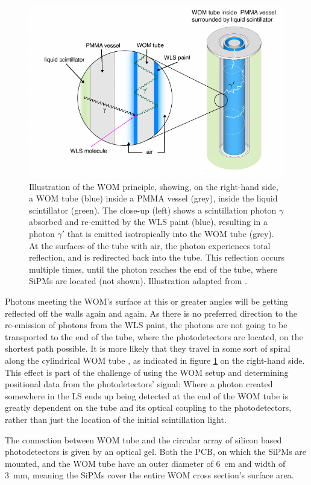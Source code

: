 	\begin{figure}[h]
		\centering
		\includegraphics[width=.8\textwidth]{pictures/wom-principle.pdf}
		\caption{Illustration of the \ac{WOM} principle, showing, on the right-hand side, a \ac{WOM} tube (blue) inside a \ac{PMMA} vessel (grey), inside the liquid scintillator (green). The close-up (left) shows a scintillation photon $\gamma$ absorbed and re-emitted by the \ac{WLS} paint (blue), resulting in a photon $\gamma'$ that is emitted isotropically into the \ac{WOM} tube (grey). At the surfaces of the tube with air, the photon experiences total reflection, and is redirected back into the tube. This reflection occurs multiple times, until the photon reaches the end of the tube, where \acsp{SiPM} are located (not shown). Illustration adapted from \cite{ZIMMERMANN}.}
		\label{fig:wom-principle}
	\end{figure}

	Photons meeting the \ac{WOM}'s surface at this or greater angles will be getting reflected off the walls again and again. As there is no preferred direction to the re-emission of photons from the \ac{WLS} paint, the photons are not going to be transported to the end of the tube, where the photodetectors are located, on the shortest path possible. It is more likely that they travel in some sort of spiral along the cylindrical \ac{WOM} tube \cite{HANEL}, as indicated in figure \ref{fig:wom-principle} on the right-hand side. This effect is part of the challenge of using the \ac{WOM} setup and determining positional data from the photodetectors' signal: Where a photon created somewhere in the \ac{LS} ends up being detected at the end of the \ac{WOM} tube is greatly dependent on the tube and its optical coupling to the photodetectors, rather than just the location of the initial scintillation light.
	
	The connection between \ac{WOM} tube and the circular array of silicon based photodetectors is given by an optical gel. Both the \ac{PCB}, on which the \acsp{SiPM} are mounted, and the \ac{WOM} tube have an outer diameter of \SI{6}{\centi\meter} and width of \SI{3}{\milli\meter}, meaning the \acsp{SiPM} cover the entire \ac{WOM} cross section's surface area. 

